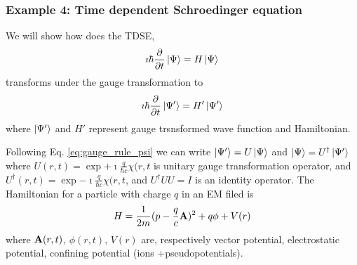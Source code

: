 \documentclass[11pt]{article}
\begin{document}
\subsubsection{Example 4: Time dependent Schroedinger equation}

We will  show  how does the  TDSE, 
\begin{equation} 
    \imath \hbar \pdv{}{t} \ket{\Psi}  = H \ket{\Psi} \label{eq:tdse}
\end{equation} 
transforms  under the  gauge transformation to 
\begin{equation} 
    \imath \hbar \pdv{}{t} \ket{\Psi'}  = H' \ket{\Psi'} \label{eq:tdse_gauge}
\end{equation}
where $\ket{\Psi'}$  and $H'$ represent  gauge trsnsformed  wave function and Hamiltonian.

Following Eq. \ref{eq:gauge_rule_psi}  we  can write  $\ket{\Psi'}= U \ket{\Psi}$ 
and  $\ket{\Psi}= U^\dag \ket{\Psi'}$ 
where  $U(r,t) = \exp{ +\imath \frac{q}{\hbar c} \chi(r,t}$ is  unitary gauge transformation  operator, and $U^\dag(r,t) = \exp{ -\imath \frac{q}{\hbar c} \chi(r,t}$, and $U^\dag U U= I$ is an identity operator.  
The Hamiltonian for a particle with charge $q$ in an EM filed is
\begin{align}
    H = \frac{1}{2m}(p- \frac{q}{c} \vb A)^2 +q \phi +V(r)
    \label{eq:hamiltonian_EM}
\end{align}
where $\vb A(r,t)$, $\phi(r,t)$, $V(r)$ are, respectively  vector potential, electrostatic potential,  confining potential (ions +pseudopotentials).
\end{document}
